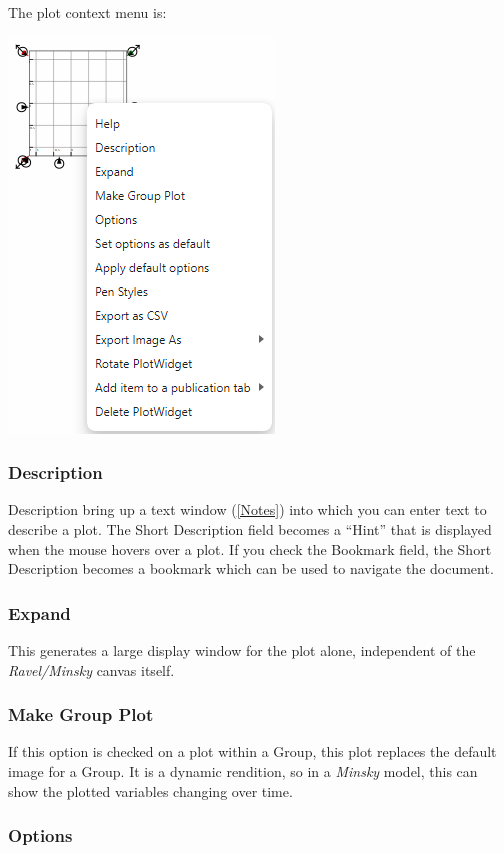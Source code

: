 The plot context menu is:

\includegraphics{images/PlotContextMenu}

\subsubsection{Description}

Description bring up a text window (\ref{Notes}) into which you can
enter text to describe a plot. The Short Description field becomes
a ``Hint'' that is displayed when the mouse hovers over a plot.
If you check the Bookmark field, the Short Description becomes a bookmark
which can be used to navigate the document.

\subsubsection{Expand}

This generates a large display window for the plot alone, independent
of the \emph{Ravel/Minsky} canvas itself.

\subsubsection{Make Group Plot}

If this option is checked on a plot within a Group, this plot replaces
the default image for a Group. It is a dynamic rendition, so in a
\emph{Minsky} model, this can show the plotted variables changing
over time.

\subsubsection{Options}

